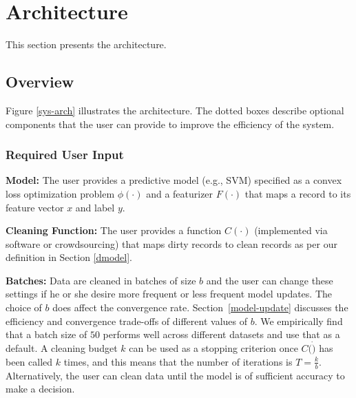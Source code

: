 \section{Architecture}\label{arch}
\noindent This section presents the \sys architecture.

\subsection{Overview}\label{sysover}
Figure \ref{sys-arch} illustrates the \sys architecture.
The dotted boxes describe optional components that the user can provide to improve the efficiency of the system.  

\subsubsection{Required User Input}\label{uinp}

\noindent\textbf{Model:} The user provides a predictive model (e.g., SVM) specified as a convex loss optimization problem $\phi(\cdot)$ and a featurizer $F(\cdot)$ that maps a record to its feature vector $x$ and label $y$.

\vspace{0.25em}

\noindent\textbf{Cleaning Function: } The user provides a function $C(\cdot)$ (implemented via software or crowdsourcing) that maps dirty records to clean records as per our definition in Section \ref{dmodel}. 

\vspace{0.25em}

\noindent\textbf{Batches: } Data are cleaned in batches of size $b$ and the user can change these settings if he or she desire more frequent or less frequent model updates.
The choice of $b$ does affect the convergence rate.
Section~\ref{model-update} discusses the efficiency and convergence trade-offs of different values of $b$.
We empirically find that a batch size of $50$ performs well across different datasets and use that as a default.
A cleaning budget $k$ can be used as a stopping criterion once $C(\dot)$ has been called $k$ times, and this means that the number of iterations is $T = \frac{k}{b}$.
Alternatively, the user can clean data until the model is of sufficient accuracy to make a decision.

